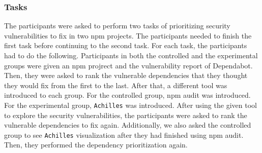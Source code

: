 \documentclass[conference]{IEEEtran}
\begin{document}
	\subsubsection{Tasks} 
	The participants were asked to perform two tasks of prioritizing security vulnerabilities to fix in two npm projects. The participants needed to finish the first task before continuing to the second task.
	For each task, the participants had to do the following. Participants in both the controlled and the experimental groups were given an npm projrect and the vulnerability report of Dependabot. Then, they were asked to rank the vulnerable dependencies that they thought they would fix from the first to the last. After that, a different tool was introduced to each group. For the controlled group, npm audit was introduced. For the experimental group, \texttt{Achilles} was introduced. After using the given tool to explore the security vulnerabilities, the participants were asked to rank the vulnerable dependencies to fix again. 
	Additionally, we also asked the controlled group to see \texttt{Achilles} visualization after they had finished using npm audit. Then, they performed the dependency prioritization again.
	
\end{document}
